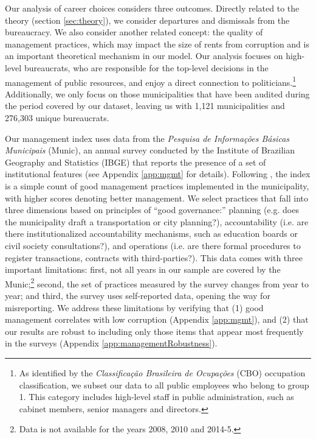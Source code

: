 \begin{table}[h]
    \centering
    \footnotesize
	
	\caption{{\textbf Descriptive statistics.} This table reports descriptive statistics about the 1,112 municipalities that have been audited between 2006 and 2015 and their employees. Unless otherwise specified, all measures are municipality-year averages.}
    \label{tbl:desc}
\end{table}

Our analysis of career choices considers three outcomes. Directly related to the theory (section \ref{sec:theory}), we consider departures and dismissals from the bureaucracy. We also consider another related concept: the quality of management practices, which may impact the size of rents from corruption and is an important theoretical mechanism in our model. Our analysis focuses on high-level bureaucrats, who are responsible for the top-level decisions in the management of public resources, and enjoy a direct connection to politicians.\footnote{As identified by the \textit{Classificação Brasileira de Ocupações} (CBO) occupation classification, we subset our data to all public employees who belong to group 1. This category includes high-level staff in public administration, such as cabinet members, senior managers and directors.} Additionally, we only focus on those municipalities that have been audited during the period covered by our dataset, leaving us with 1,121 municipalities and 276,303 unique bureaucrats. 

Our management index uses data from the \textit{Pesquisa de Informações Básicas Municipais} (Munic), an annual survey conducted by the Institute of Brazilian Geography and Statistics (IBGE) that reports the presence of a set of institutional features (see Appendix \ref{app:mgmt} for details). Following \citet{grindle_good_2004,Bloom2007}, the index is a simple count of good management practices implemented in the municipality, with higher scores denoting better management. We select practices that fall into three dimensions based on principles of ``good governance:'' planning (e.g. does the municipality draft a transportation or city planning?), accountability (i.e. are there institutionalized accountability mechanisms, such as education boards or civil society consultations?), and operations (i.e. are there formal procedures to register transactions, contracts with third-parties?). This data comes with three important limitations: first, not all years in our sample are covered by the Munic;\footnote{Data is not available for the years 2008, 2010 and 2014-5.} second, the set of practices measured by the survey changes from year to year; and third, the survey uses self-reported data, opening the way for misreporting. We address these limitations by verifying that (1) good management correlates with low corruption (Appendix \ref{app:mgmt}), and (2) that our results are robust to including only those items that appear most frequently in the surveys (Appendix \ref{app:managementRobustness}). 

